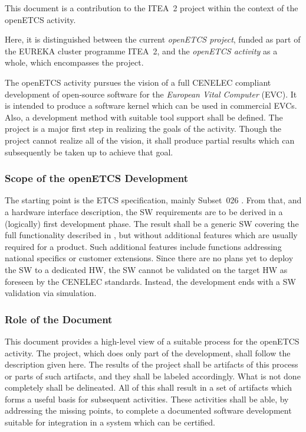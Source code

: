 \documentclass{template/openetcs_article}
\begin{document}
This document is a contribution to the ITEA~2 project within the
context of the openETCS activity.

Here, it is distinguished between the current \emph{openETCS project}, funded as
part of the EUREKA cluster programme ITEA~2, and the \emph{openETCS activity}
as a whole, which encompasses the project.

The openETCS activity pursues the vision of a full CENELEC compliant
development of open-source software for the \emph{European Vital
  Computer} (EVC). It is intended to produce a software kernel which
can be used in commercial EVCs. Also, a development method with
suitable tool support shall be defined. The project is a major first
step in realizing the goals of the activity. Though the project cannot
realize all of the vision, it shall produce partial results which can
subsequently be taken up to achieve that goal.

\subsubsection{Scope of the openETCS Development}
\label{sec:scope-development}

The starting point is the ETCS specification, mainly Subset~026
\cite{subset-026:3.3.0}. From that, and a hardware interface
description, the SW requirements are to be derived in a (logically)
first development phase. The result shall be a generic SW covering the
full functionality described in \cite{subset-026:3.3.0}, but without
additional features which are usually required for a product. Such
additional features include functions addressing national specifics or
customer extensions. Since there are no plans yet to deploy the SW to
a dedicated HW, the SW cannot be validated on the target HW as
foreseen by the CENELEC standards. Instead, the development ends with
a SW validation via simulation.

\subsubsection{Role of the Document}
\label{sec:role-document}

This document provides a high-level view of a suitable process for the
openETCS activity. The project, which does only part of the
development, shall follow the description given here. The results of
the project shall be artifacts of this process or parts of such
artifacts, and they shall be labeled accordingly. What is not done
completely shall be delineated. All of this shall result in a set of
artifacts which forms a useful basis for subsequent activities. These
activities shall be able, by addressing the missing points, to
complete a documented software development suitable for integration in
a system which can be certified.
\end{document}
